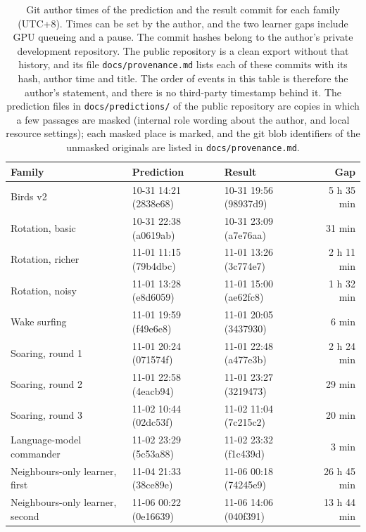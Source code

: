 \documentclass[11pt]{article}
\begin{document}
\begin{table}[h]
\centering
\small
\caption{Git author times of the prediction and the result commit for each family (UTC+8). Times can be set by the author, and the two learner gaps include GPU queueing and a pause. The commit hashes belong to the author's private development repository. The public repository is a clean export without that history, and its file \texttt{docs/provenance.md} lists each of these commits with its hash, author time and title. The order of events in this table is therefore the author's statement, and there is no third-party timestamp behind it. The prediction files in \texttt{docs/predictions/} of the public repository are copies in which a few passages are masked (internal role wording about the author, and local resource settings); each masked place is marked, and the git blob identifiers of the unmasked originals are listed in \texttt{docs/provenance.md}.}
\label{tab:timeline}
\begin{tabular}{@{}lllr@{}}
\toprule
Family & Prediction & Result & Gap \\
\midrule
Birds v2 & 10-31 14:21 (2838e68) & 10-31 19:56 (98937d9) & 5 h 35 min \\
Rotation, basic & 10-31 22:38 (a0619ab) & 10-31 23:09 (a7e76aa) & 31 min \\
Rotation, richer & 11-01 11:15 (79b4dbc) & 11-01 13:26 (3c774e7) & 2 h 11 min \\
Rotation, noisy & 11-01 13:28 (e8d6059) & 11-01 15:00 (ae62fc8) & 1 h 32 min \\
Wake surfing & 11-01 19:59 (f49e6e8) & 11-01 20:05 (3437930) & 6 min \\
Soaring, round 1 & 11-01 20:24 (071574f) & 11-01 22:48 (a477e3b) & 2 h 24 min \\
Soaring, round 2 & 11-01 22:58 (4eacb94) & 11-01 23:27 (3219473) & 29 min \\
Soaring, round 3 & 11-02 10:44 (02dc53f) & 11-02 11:04 (7c215c2) & 20 min \\
Language-model commander & 11-02 23:29 (5c53a88) & 11-02 23:32 (f1c439d) & 3 min \\
Neighbours-only learner, first & 11-04 21:33 (38ce89e) & 11-06 00:18 (74245e9) & 26 h 45 min \\
Neighbours-only learner, second & 11-06 00:22 (0e16639) & 11-06 14:06 (040f391) & 13 h 44 min \\
\bottomrule
\end{tabular}
\end{table}
\end{document}
